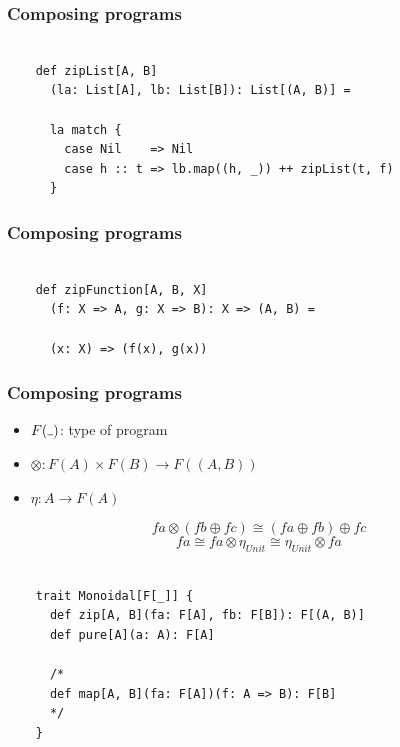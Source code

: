 \documentclass{beamer}
\begin{document}
\begin{frame}[fragile]

  \frametitle{Composing programs}

  \begin{verbatim}

    def zipList[A, B]
      (la: List[A], lb: List[B]): List[(A, B)] =

      la match {
        case Nil    => Nil
        case h :: t => lb.map((h, _)) ++ zipList(t, f)
      }

  \end{verbatim}

\end{frame}

\begin{frame}[fragile]

  \frametitle{Composing programs}

  \begin{verbatim}

    def zipFunction[A, B, X]
      (f: X => A, g: X => B): X => (A, B) =

      (x: X) => (f(x), g(x))

  \end{verbatim}

\end{frame}

\begin{frame}[fragile]

  \frametitle{Composing programs}
  \Large

  \begin{itemize}
    \item $F(\rule{1ex}{.4pt})$: type of program \pause
    \item $\otimes: F(A) \times F(B) \rightarrow F((A, B))$ \pause
    \item $\eta: A \rightarrow F(A)$ \pause
  \end{itemize}

  $$fa \otimes (fb \oplus fc) \cong (fa \oplus fb) \oplus fc$$
  $$fa \cong fa \otimes \eta_{Unit} \cong \eta_{Unit} \otimes fa$$

\end{frame}

\begin{frame}[fragile]

  \begin{verbatim}

    trait Monoidal[F[_]] {
      def zip[A, B](fa: F[A], fb: F[B]): F[(A, B)]
      def pure[A](a: A): F[A]

      /*
      def map[A, B](fa: F[A])(f: A => B): F[B]
      */
    }

  \end{verbatim}

\end{frame}
\end{document}
